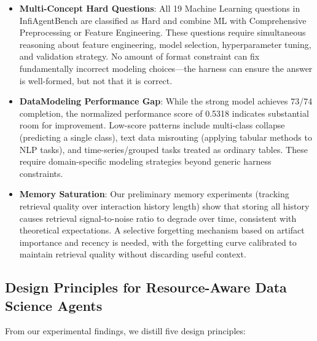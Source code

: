 \documentclass[letterpaper]{article} %
\begin{document}
\begin{itemize}
    \item \textbf{Multi-Concept Hard Questions}: All 19 Machine Learning questions in InfiAgentBench are classified as Hard and combine ML with Comprehensive Preprocessing or Feature Engineering. These questions require simultaneous reasoning about feature engineering, model selection, hyperparameter tuning, and validation strategy. No amount of format constraint can fix fundamentally incorrect modeling choices---the harness can ensure the answer is well-formed, but not that it is correct.
    \item \textbf{DataModeling Performance Gap}: While the strong model achieves 73/74 completion, the normalized performance score of 0.5318 indicates substantial room for improvement. Low-score patterns include multi-class collapse (predicting a single class), text data misrouting (applying tabular methods to NLP tasks), and time-series/grouped tasks treated as ordinary tables. These require domain-specific modeling strategies beyond generic harness constraints.
    \item \textbf{Memory Saturation}: Our preliminary memory experiments (tracking retrieval quality over interaction history length) show that storing all history causes retrieval signal-to-noise ratio to degrade over time, consistent with theoretical expectations. A selective forgetting mechanism based on artifact importance and recency is needed, with the forgetting curve calibrated to maintain retrieval quality without discarding useful context.
\end{itemize}

\subsection{Design Principles for Resource-Aware Data Science Agents}

From our experimental findings, we distill five design principles:
\end{document}
